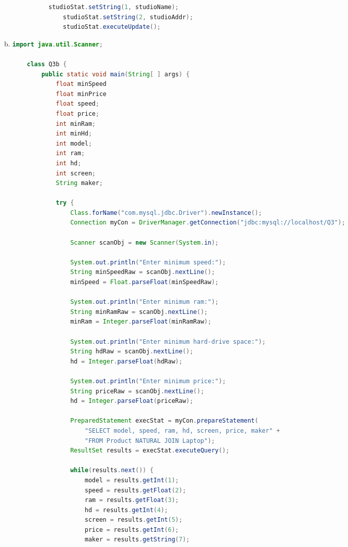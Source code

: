 \documentclass[12pt]{article}
\begin{document}
\begin{enumerate}[1.]
\begin{enumerate}[a)]
\begin{itemize}
\begin{itemize}
\begin{itemize}
\begin{lstlisting}[language=JAVA]
    studioStat.setString(1, studioName);
    studioStat.setString(2, studioAddr);
    studioStat.executeUpdate();
    \end{lstlisting}
                \end{itemize}
            \end{itemize}
        \end{itemize}

        \item

    \begin{lstlisting}[language=JAVA]
    import java.util.Scanner;

    class Q3b {
        public static void main(String[ ] args) {
            float minSpeed
            float minPrice
            float speed;
            float price;
            int minRam;
            int minHd;
            int model;
            int ram;
            int hd;
            int screen;
            String maker;

            try {
                Class.forName("com.mysql.jdbc.Driver").newInstance();
                Connection myCon = DriverManager.getConnection("jdbc:mysql://localhost/Q3");

                Scanner scanObj = new Scanner(System.in);

                System.out.println("Enter minimum speed:");
                String minSpeedRaw = scanObj.nextLine();
                minSpeed = Float.parseFloat(minSpeedRaw);

                System.out.println("Enter minimum ram:");
                String minRamRaw = scanObj.nextLine();
                minRam = Integer.parseFloat(minRamRaw);

                System.out.println("Enter minimum hard-drive space:");
                String hdRaw = scanObj.nextLine();
                hd = Integer.parseFloat(hdRaw);

                System.out.println("Enter minimum price:");
                String priceRaw = scanObj.nextLine();
                hd = Integer.parseFloat(priceRaw);

                PreparedStatement execStat = myCon.prepareStatement(
                    "SELECT model, speed, ram, hd, screen, price, maker" +
                    "FROM Product NATURAL JOIN Laptop");
                ResultSet results = execStat.executeQuery();

                while(results.next()) {
                    model = results.getInt(1);
                    speed = results.getFloat(2);
                    ram = results.getFloat(3);
                    hd = results.getInt(4);
                    screen = results.getInt(5);
                    price = results.getInt(6);
                    maker = results.getString(7);


\end{lstlisting}
\end{enumerate}
\end{enumerate}
\end{document}
